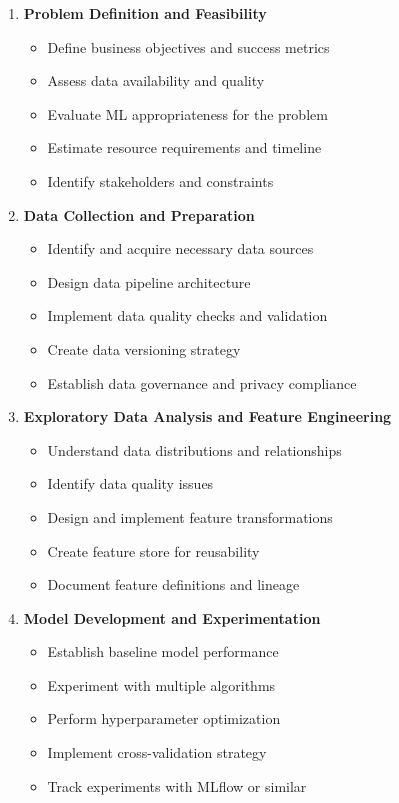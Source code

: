 \begin{enumerate}
    \item \textbf{Problem Definition and Feasibility}
    \begin{itemize}
        \item Define business objectives and success metrics
        \item Assess data availability and quality
        \item Evaluate ML appropriateness for the problem
        \item Estimate resource requirements and timeline
        \item Identify stakeholders and constraints
    \end{itemize}

    \item \textbf{Data Collection and Preparation}
    \begin{itemize}
        \item Identify and acquire necessary data sources
        \item Design data pipeline architecture
        \item Implement data quality checks and validation
        \item Create data versioning strategy
        \item Establish data governance and privacy compliance
    \end{itemize}

    \item \textbf{Exploratory Data Analysis and Feature Engineering}
    \begin{itemize}
        \item Understand data distributions and relationships
        \item Identify data quality issues
        \item Design and implement feature transformations
        \item Create feature store for reusability
        \item Document feature definitions and lineage
    \end{itemize}

    \item \textbf{Model Development and Experimentation}
    \begin{itemize}
        \item Establish baseline model performance
        \item Experiment with multiple algorithms
        \item Perform hyperparameter optimization
        \item Implement cross-validation strategy
        \item Track experiments with MLflow or similar
    \end{itemize}


\end{enumerate}

